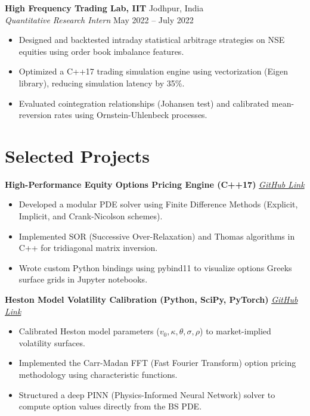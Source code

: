 \documentclass[10pt,letterpaper]{article}
\begin{document}
\medskip

\textbf{High Frequency Trading Lab, IIT} \hfill Jodhpur, India \\
\textit{Quantitative Research Intern} \hfill May 2022 -- July 2022
\begin{itemize}
    \item Designed and backtested intraday statistical arbitrage strategies on NSE equities using order book imbalance features.
    \item Optimized a C++17 trading simulation engine using vectorization (Eigen library), reducing simulation latency by 35\%.
    \item Evaluated cointegration relationships (Johansen test) and calibrated mean-reversion rates using Ornstein-Uhlenbeck processes.
\end{itemize}

\section{Selected Projects}
\textbf{High-Performance Equity Options Pricing Engine (C++17)} \hfill \href{https://github.com/iitakjha97/quant-pde-solver}{\textit{GitHub Link}}
\begin{itemize}
    \item Developed a modular PDE solver using Finite Difference Methods (Explicit, Implicit, and Crank-Nicolson schemes).
    \item Implemented SOR (Successive Over-Relaxation) and Thomas algorithms in C++ for tridiagonal matrix inversion.
    \item Wrote custom Python bindings using pybind11 to visualize options Greeks surface grids in Jupyter notebooks.
\end{itemize}

\medskip

\textbf{Heston Model Volatility Calibration (Python, SciPy, PyTorch)} \hfill \href{https://github.com/iitakjha97/heston-calibration}{\textit{GitHub Link}}
\begin{itemize}
    \item Calibrated Heston model parameters ($v_0, \kappa, \theta, \sigma, \rho$) to market-implied volatility surfaces.
    \item Implemented the Carr-Madan FFT (Fast Fourier Transform) option pricing methodology using characteristic functions.
    \item Structured a deep PINN (Physics-Informed Neural Network) solver to compute option values directly from the BS PDE.
\end{itemize}
\end{document}

